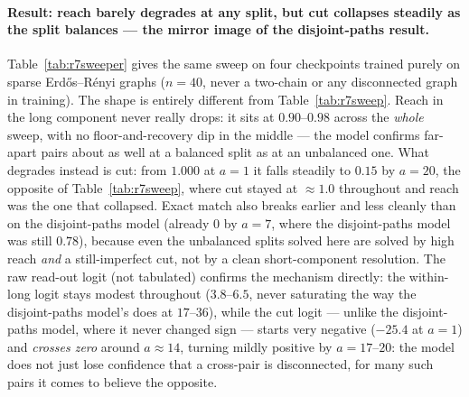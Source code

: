 \documentclass[11pt,a4paper]{article}
\begin{document}
\paragraph{Result: reach barely degrades at any split, but cut collapses steadily as the
split balances --- the mirror image of the disjoint-paths result.} Table~\ref{tab:r7sweeper}
gives the same sweep on four checkpoints trained purely on sparse Erd\H{o}s--R\'enyi graphs
($n=40$, never a two-chain or any disconnected graph in training). The shape is entirely
different from Table~\ref{tab:r7sweep}. Reach in the long component never really drops: it
sits at $0.90$--$0.98$ across the \emph{whole} sweep, with no floor-and-recovery dip in the
middle --- the model confirms far-apart pairs about as well at a balanced split as at an
unbalanced one. What degrades instead is cut: from $1.000$ at $a=1$ it falls steadily to
$0.15$ by $a=20$, the opposite of Table~\ref{tab:r7sweep}, where cut stayed at
$\approx1.0$ throughout and reach was the one that collapsed. Exact match also breaks earlier
and less cleanly than on the disjoint-paths model (already $0$ by $a=7$, where the
disjoint-paths model was still $0.78$), because even the unbalanced splits solved here are
solved by high reach \emph{and} a still-imperfect cut, not by a clean short-component
resolution. The raw read-out logit (not tabulated) confirms the mechanism directly: the
within-long logit stays modest throughout ($3.8$--$6.5$, never saturating the way the
disjoint-paths model's does at $17$--$36$), while the cut logit --- unlike the disjoint-paths
model, where it never changed sign --- starts very negative ($-25.4$ at $a=1$) and
\emph{crosses zero} around $a\approx14$, turning mildly positive by $a=17$--$20$: the model
does not just lose confidence that a cross-pair is disconnected, for many such pairs it comes
to believe the opposite.
\end{document}
